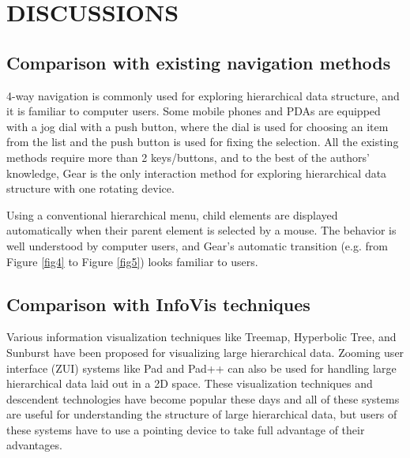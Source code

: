 \documentclass{article}
\begin{document}
\section*{DISCUSSIONS}

\subsection{Comparison with existing navigation methods}

4-way navigation is commonly used for exploring hierarchical data structure,
and it is familiar to computer users.
Some mobile phones and PDAs are equipped with a jog dial with a push button,
where the dial is used for choosing an item from the list and 
the push button is used for fixing the selection.
All the existing methods require more than 2 keys/buttons, and
to the best of the authors' knowledge,
Gear is the only interaction method for exploring hierarchical data structure
with one rotating device.

Using a conventional hierarchical menu,
child elements are displayed automatically when their parent element is selected by a mouse.
The behavior is well understood by computer users,
and Gear's automatic transition (e.g. from Figure \ref{fig4} to Figure \ref{fig5})
looks familiar to users.

\subsection{Comparison with InfoVis techniques}

Various information visualization techniques like
Treemap\cite{Johnson:1991:TSA:949607.949654},
Hyperbolic Tree\cite{Lamping:1995:FTB:223904.223956},
and Sunburst\cite{Stasko:2000:FDN:857190.857683}
have been proposed for visualizing large hierarchical data.
Zooming user interface (ZUI) systems like
Pad\cite{Perlin:1993:PAA:166117.166125} and
Pad++\cite{Bederson:1994:PZG:192426.192435}
can also be used for handling large hierarchical data laid out in a 2D space.
%
These visualization techniques and descendent technologies have become popular these days and
all of these systems are useful for understanding the structure of
large hierarchical data, but users of these systems have to use a pointing device
to take full advantage of their advantages.

\end{document}
